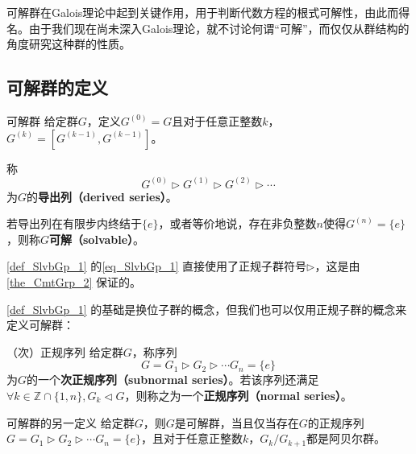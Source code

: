 


可解群在Galois理论中起到关键作用，用于判断代数方程的根式可解性，由此而得名。由于我们现在尚未深入Galois理论，就不讨论何谓“可解”，而仅仅从群结构的角度研究这种群的性质。


\subsection{可解群的定义}


\begin{definition}{可解群}\label{def_SlvbGp_1}
给定群$G$，定义$G^{(0)}=G$且对于任意正整数$k$，$G^{(k)}=[G^{(k-1)}, G^{(k-1)}]$。

称
\begin{equation}\label{eq_SlvbGp_1}
G^{(0)}\rhd G^{(1)}\rhd G^{(2)}\rhd \cdots~
\end{equation}
为$G$的\textbf{导出列（derived series）}。

若导出列在有限步内终结于$\{e\}$，或者等价地说，存在非负整数$n$使得$G^{(n)}=\{e\}$，则称$G$\textbf{可解（solvable）}。

\end{definition}


\autoref{def_SlvbGp_1} 的\autoref{eq_SlvbGp_1} 直接使用了正规子群符号$\rhd$，这是由\autoref{the_CmtGrp_2} 保证的。



\autoref{def_SlvbGp_1} 的基础是换位子群的概念，但我们也可以仅用正规子群的概念来定义可解群：



\begin{definition}{（次）正规序列}
给定群$G$，称序列
\begin{equation}
G=G_1\rhd G_2\rhd\cdots G_n=\{e\}~
\end{equation}
为$G$的一个\textbf{次正规序列（subnormal series）}。若该序列还满足$\forall k\in \mathbb{Z}\cap\{1, n\}, G_k\lhd G$，则称之为一个\textbf{正规序列（normal series）}。
\end{definition}



\begin{theorem}{可解群的另一定义}\label{the_SlvbGp_1}
给定群$G$，则$G$是可解群，当且仅当存在$G$的正规序列$G=G_1\rhd G_2\rhd\cdots G_n=\{e\}$，且对于任意正整数$k$，$G_k/G_{k+1}$都是阿贝尔群。
\end{theorem}


